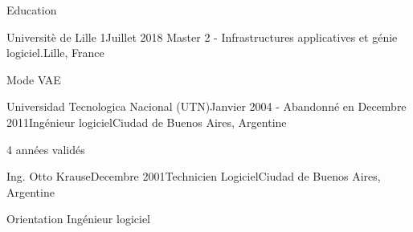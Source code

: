\documentclass{resume} %
\begin{document}
\begin{rSection}{Education}


	\begin{rSubsection}{Universit\`{e} de Lille 1}{Juillet 2018}{ Master 2 - Infrastructures applicatives et g\'{e}nie logiciel.}{Lille, France}
		\item  Mode VAE
	\end{rSubsection}
	\begin{rSubsection}{Universidad Tecnologica Nacional (UTN)}{Janvier 2004 - Abandonn\'{e} en Decembre 2011}{Ing\'{e}nieur logiciel}{Ciudad de Buenos Aires, Argentine}
		\item 4 années validés 
	\end{rSubsection}
	\begin{rSubsection}{Ing. Otto Krause}{Decembre 2001}{Technicien Logiciel}{Ciudad de Buenos Aires, Argentine}
		\item Orientation Ing\'{e}nieur logiciel
	\end{rSubsection}
\end{rSection}






\end{document}
